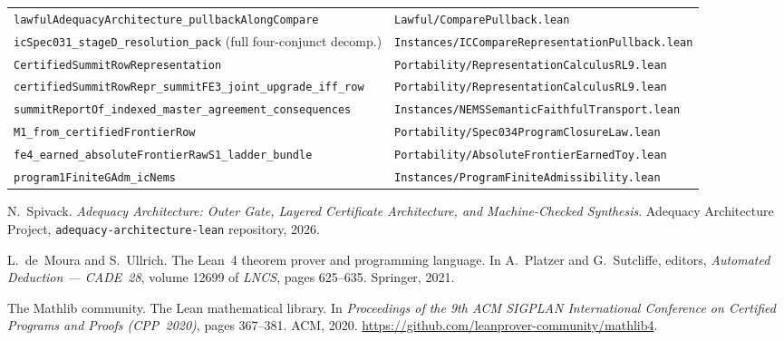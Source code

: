 \documentclass[11pt]{article}
\theoremstyle{plain}
\theoremstyle{definition}
\theoremstyle{remark}
\begin{document}
{\begin{tabular}{@{}ll@{}}
\texttt{lawfulAdequacyArchitecture\_\-pullbackAlongCompare} &
  \texttt{Lawful/ComparePullback.lean} \\
\texttt{icSpec031\_stageD\_resolution\_pack} (full four-conjunct decomp.) &
  \texttt{Instances/ICCompareRepresentation\-Pullback.lean} \\
\texttt{CertifiedSummitRowRepresentation} &
  \texttt{Portability/Representation\-CalculusRL9.lean} \\
\texttt{certifiedSummitRowRepr\_summitFE3\_\-joint\_upgrade\_iff\_row} &
  \texttt{Portability/Representation\-CalculusRL9.lean} \\
\texttt{summitReportOf\_indexed\_master\_\-agreement\_consequences} &
  \texttt{Instances/NEMSSemantic\-FaithfulTransport.lean} \\
\texttt{M1\_from\_certifiedFrontierRow} &
  \texttt{Portability/Spec034Program\-ClosureLaw.lean} \\
\texttt{fe4\_earned\_absoluteFrontierRawS1\_ladder\_bundle} &
  \texttt{Portability/AbsoluteFrontier\-EarnedToy.lean} \\
\texttt{program1FiniteGAdm\_icNems} &
  \texttt{Instances/ProgramFinite\-Admissibility.lean} \\
\hline
\end{tabular}%
}%
\endgroup

\begin{thebibliography}{9}

N.~Spivack.
\newblock \emph{Adequacy Architecture: Outer Gate, Layered Certificate
  Architecture, and Machine-Checked Synthesis}.
\newblock Adequacy Architecture Project, \texttt{adequacy-architecture-lean}
  repository, 2026.

L.~de~Moura and S.~Ullrich.
\newblock The {L}ean~4 theorem prover and programming language.
\newblock In A.~Platzer and G.~Sutcliffe, editors,
  \emph{Automated Deduction --- CADE~28}, volume 12699 of \emph{LNCS},
  pages 625--635. Springer, 2021.

The Mathlib community.
\newblock The {L}ean mathematical library.
\newblock In \emph{Proceedings of the 9th ACM SIGPLAN International Conference
  on Certified Programs and Proofs (CPP~2020)}, pages 367--381. ACM, 2020.
\newblock \url{https://github.com/leanprover-community/mathlib4}.

\end{thebibliography}
\end{document}
